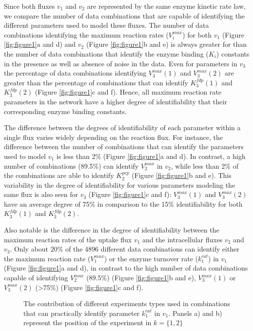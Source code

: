 \documentclass[10pt]{article}
\begin{document}
Since both fluxes $v_1$ and $v_2$ are represented by the same enzyme kinetic rate law, we compare the number of data combinations that are capable of identifying the different parameters used to model these fluxes. The number of data combinations identifying the maximum reaction rates ($V_i^{max}$) for both $v_1$ (Figure \ref{fig:figure1}a and d) and $v_2$ (Figure \ref{fig:figure1}b and e) is always greater for than the number of data combinations that identify the enzyme binding ($K_i$) constants in the presence as well as absence of noise in the data. Even for parameters in $v_3$ the percentage of data combinations identifying $V_3^{max} (1)$ and $V_3^{max}(2)$ are greater than the percentage of combinations that can identify $K_3^{fdp}(1)$ and $K_3^{fdp}(2)$ (Figure \ref{fig:figure1}c and f). Hence, all maximum reaction rate parameters in the network have a higher degree of identifiability that their corresponding enzyme binding constants.

The difference between the degrees of identifiability of each parameter within a single flux varies widely depending on the reaction flux. For instance, the difference between the number of combinations that can identify the parameters used to model $v_1$ is less than 2\% (Figure \ref{fig:figure1}a and d). In contrast, a high number of combinations (89.5\%) can identify $V_2^{max}$ in $v_2$, while less than 2\% of the combinations are able to identify $K_2^{pep}$ (Figure \ref{fig:figure1}b and e). This variability in the degree of identifiability for various parameters modeling the same flux is also seen for $v_3$ (Figure \ref{fig:figure1}c and f): $V_3^{max} (1)$ and $V_3^{max} (2)$ have an average degree of 75\% in comparison to the 15\% identifiability for both $K_3^{fdp} (1)$ and $K_3^{fdp} (2)$. 

Also notable is the difference in the degree of identifiability between the maximum reaction rates of the uptake flux $v_1$ and the intracellular fluxes $v_2$ and $v_3$. Only about 20\% of the 4896 different data combinations can identify either the maximum reaction rate ($V_1^{max}$) or the enzyme turnover rate ($k_1^{cat}$) in $v_1$ (Figure \ref{fig:figure1}a and d), in contrast to the high number of data combinations capable of identifying $V_2^{max}$ (89.5\%) (Figure \ref{fig:figure1}b and e), $V_3^{max} (1)$ or $V_3^{max} (2)$ (>75\%) (Figure \ref{fig:figure1}c and f). 

\begin{figure}[!tbhp]
	\caption{The contribution of different experiments types used in combinations that can practically identify parameter $k_1^{cat}$ in $v_1$. Panels a) and b) represent the position of the experiment in $k = \{1, 2\}$}\label{fig:figure2}
\end{figure}
\end{document}
